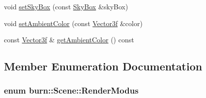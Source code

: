 \begin{DoxyCompactItemize}
\item 
void \hyperlink{classburn_1_1_scene_ae569a4b21af331b5403ca444d83e4884}{set\-Sky\-Box} (const \hyperlink{classburn_1_1_sky_box}{Sky\-Box} \&sky\-Box)
\item 
void \hyperlink{classburn_1_1_scene_a8bfd8a10ac26bd647b2391ff6c3b4b66}{set\-Ambient\-Color} (const \hyperlink{namespaceburn_afdd7cfb352b9612432faf6947b6fff74}{Vector3f} \&color)
\item 
const \hyperlink{namespaceburn_afdd7cfb352b9612432faf6947b6fff74}{Vector3f} \& \hyperlink{classburn_1_1_scene_a8abbd3b6bb1737c80366d059bbdc1ea5}{get\-Ambient\-Color} () const 
\end{DoxyCompactItemize}


\subsection{Member Enumeration Documentation}
\hypertarget{classburn_1_1_scene_a992349a23199d694dca7b8cbd4957299}{
\subsubsection[{Render\-Modus}]{\setlength{\rightskip}{0pt plus 5cm}enum {\bf burn\-::\-Scene\-::\-Render\-Modus}}}\label{classburn_1_1_scene_a992349a23199d694dca7b8cbd4957299}
